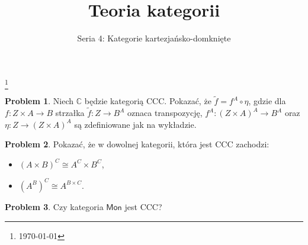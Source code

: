 \documentclass[10pt]{amsart}
\title{Teoria kategorii}
\author{Seria 4: Kategorie kartezjańsko-domknięte}
\theoremstyle{plain}
\theoremstyle{definition}
\newtheorem{problem}{Problem}
\numberwithin{equation}{section}
\newcommand\blfootnote[1]{%
  \begingroup
  \renewcommand\thefootnote{}\footnote{#1}%
  \addtocounter{footnote}{-1}%
  \endgroup
}
\begin{document}
\maketitle

\blfootnote{\today}
\begin{problem}
Niech $\mathbb{C}$ będzie kategorią CCC. Pokazać, że $\tilde{f} = f^A\circ \eta$, gdzie dla $f:Z\times A\to B$ 
strzałka $\tilde{f}:Z\to B^A$ oznaca transpozycję, $f^A:(Z\times A)^A\to B^A$ oraz $\eta:Z\to (Z\times A)^A$ są zdefiniowane 
jak na wykładzie.
\end{problem}

\begin{problem}
Pokazać, że w dowolnej kategorii, która jest CCC zachodzi:
\begin{itemize}
\item $(A\times B)^C \cong A^C\times B^C$,
\item $(A^B)^C \cong A^{B\times C}$.
\end{itemize}
\end{problem}

\begin{problem}
Czy kategoria $\mathsf{Mon}$ jest CCC?
\end{problem}


%
\end{document}
